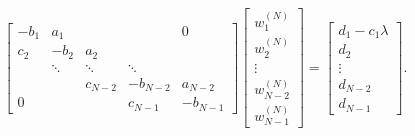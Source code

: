 \[\begin{bmatrix}-b_{1}&a_{1}&&&0\\
c_{2}&-b_{2}&a_{2}\\
&\ddots&\ddots&\ddots\\
&&c_{N-2}&-b_{N-2}&a_{N-2}\\
0&&&c_{N-1}&-b_{N-1}\end{bmatrix}\begin{bmatrix}w_{1}^{(N)}\\
w_{2}^{(N)}\\
\vdots\\
w_{N-2}^{(N)}\\
w_{N-1}^{(N)}\end{bmatrix}=\begin{bmatrix}d_{1}-c_{1}\lambda\\
d_{2}\\
\vdots\\
d_{N-2}\\
d_{N-1}\end{bmatrix}.\]